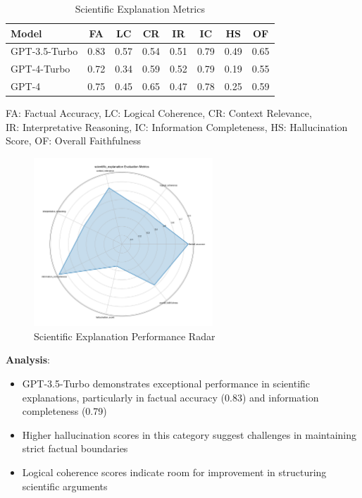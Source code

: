 \begin{table}[!htbp]
\centering
\setlength{\tabcolsep}{4pt}  %
\begin{tabular}{|l|c|c|c|c|c|c|c|}
\hline
\textbf{Model} & \textbf{FA} & \textbf{LC} & \textbf{CR} & \textbf{IR} 
& \textbf{IC} & \textbf{HS} & \textbf{OF} \\
\hline
GPT-3.5-Turbo & 0.83 & 0.57 & 0.54 & 0.51 & 0.79 & 0.49 & 0.65 \\
GPT-4-Turbo & 0.72 & 0.34 & 0.59 & 0.52 & 0.79 & 0.19 & 0.55 \\
GPT-4 & 0.75 & 0.45 & 0.65 & 0.47 & 0.78 & 0.25 & 0.59 \\
\hline
\end{tabular}
\caption{Scientific Explanation Metrics}
\label{tab:results_scientific_metrics}
\begin{flushleft}
\small
FA: Factual Accuracy, LC: Logical Coherence, CR: Context Relevance,\\
IR: Interpretative Reasoning, IC: Information Completeness, HS: Hallucination Score, OF: Overall Faithfulness
\end{flushleft}
\end{table}

\begin{figure}[!htbp]
\centering
\includegraphics[width=0.6\textwidth]{figures/types/scientific_explanation_radar_gpt-4.png}
\caption{Scientific Explanation Performance Radar}
\label{fig:scientific_radar}
\end{figure}

\textbf{Analysis}:
\begin{itemize}
    \item GPT-3.5-Turbo demonstrates exceptional performance in scientific explanations, particularly in factual accuracy (0.83) and information completeness (0.79)
    \item Higher hallucination scores in this category suggest challenges in maintaining strict factual boundaries
    \item Logical coherence scores indicate room for improvement in structuring scientific arguments
\end{itemize}

